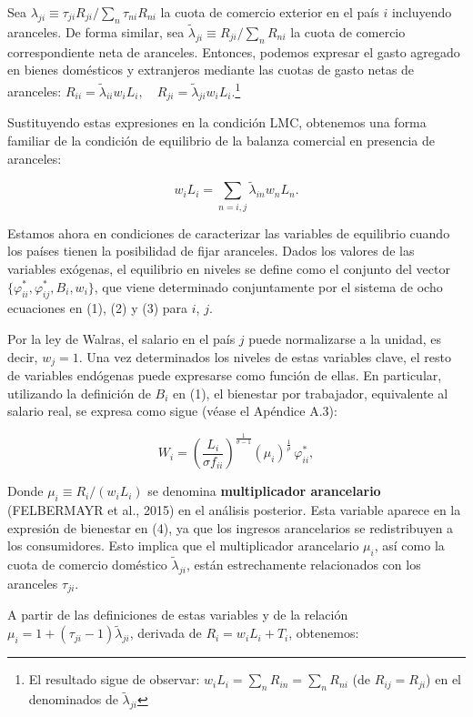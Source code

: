 \documentclass[10pt,a4paper]{article}
\begin{document}
Sea $\lambda_{ji} \equiv \tau_{ji} R_{ji} / \sum_n \tau_{ni} R_{ni}$ la cuota de comercio exterior en el país $i$ incluyendo aranceles. De forma similar, sea $\tilde{\lambda}_{ji} \equiv R_{ji} / \sum_n R_{ni}$ la cuota de comercio correspondiente neta de aranceles. Entonces, podemos expresar el gasto agregado en bienes domésticos y extranjeros mediante las cuotas de gasto netas de aranceles: $R_{ii} = \tilde{\lambda}_{ii} w_i L_i, \quad R_{ji} = \tilde{\lambda}_{ji} w_i L_i$.\footnote{%
    El resultado sigue de observar: $w_iL_i=\sum_nR_{in}=\sum_nR_{ni}$ (de $R_{ij}=R_{ji}$) en el denominados de $\tilde\lambda_{ji}$
}

Sustituyendo estas expresiones en la condición LMC, obtenemos una forma familiar de la condición de equilibrio de la balanza comercial en presencia de aranceles:

$$w_i L_i = \sum_{n=i,j} \tilde{\lambda}_{in} w_n L_n. \tag{3}$$

Estamos ahora en condiciones de caracterizar las variables de equilibrio cuando los países tienen la posibilidad de fijar aranceles. Dados los valores de las variables exógenas, el equilibrio en niveles se define como el conjunto del vector $\{\varphi_{ii}^*, \varphi_{ij}^*, B_i, w_i\}$, que viene determinado conjuntamente por el sistema de ocho ecuaciones en (1), (2) y (3) para $i$, $j$. 

Por la ley de Walras, el salario en el país $j$ puede normalizarse a la unidad, es decir, $w_j = 1$. Una vez determinados los niveles de estas variables clave, el resto de variables endógenas puede expresarse como función de ellas. En particular, utilizando la definición de $B_i$ en (1), el bienestar por trabajador, equivalente al salario real, se expresa como sigue (véase el Apéndice A.3):

$$W_i =\left(\frac{L_i}{\sigma f_{ii}}\right)^{\frac{1}{\sigma-1}}(\mu_i)^{\frac{1}{\rho}} \,\varphi_{ii}^*, \tag{4}$$

Donde $\mu_i \equiv R_i/(w_i L_i)$ se denomina \textbf{multiplicador arancelario} (FELBERMAYR et al., 2015) en el análisis posterior. Esta variable aparece en la expresión de bienestar en (4), ya que los ingresos arancelarios se redistribuyen a los consumidores. Esto implica que el multiplicador arancelario $\mu_i$, así como la cuota de comercio doméstico $\tilde{\lambda}_{ji}$, están estrechamente relacionados con los aranceles $\tau_{ji}$.

A partir de las definiciones de estas variables y de la relación $\mu_i = 1 + (\tau_{ji} - 1)\tilde{\lambda}_{ji}$, derivada de $R_i = w_i L_i + T_i$, obtenemos:
\end{document}
